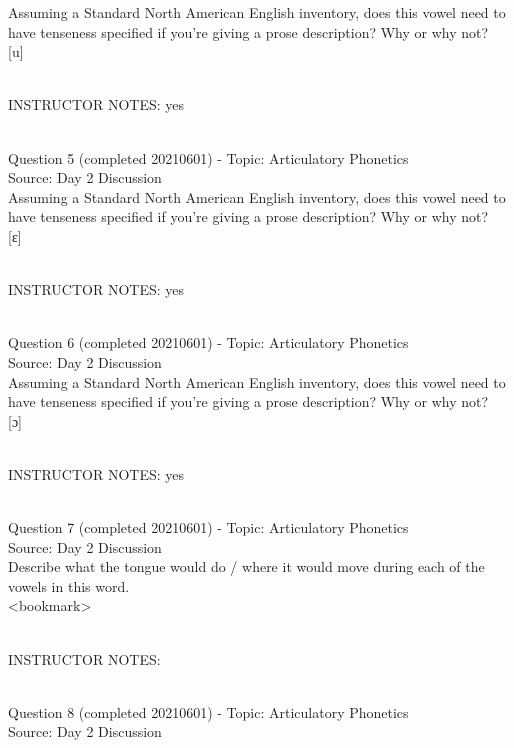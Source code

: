 \documentclass[12pt]{article}
\begin{document}
Assuming a Standard North American English inventory, does this vowel need to have tenseness specified if you're giving a prose description? Why or why not?\\

{[u]}


~\\
INSTRUCTOR NOTES: yes


~\\

{\large Question 5} (completed 20210601) - Topic: Articulatory Phonetics\\
Source: Day 2 Discussion\\

Assuming a Standard North American English inventory, does this vowel need to have tenseness specified if you're giving a prose description? Why or why not?\\

{[ɛ]}


~\\
INSTRUCTOR NOTES: yes


~\\

{\large Question 6} (completed 20210601) - Topic: Articulatory Phonetics\\
Source: Day 2 Discussion\\

Assuming a Standard North American English inventory, does this vowel need to have tenseness specified if you're giving a prose description? Why or why not?\\

{[ɔ]}


~\\
INSTRUCTOR NOTES: yes


~\\

{\large Question 7} (completed 20210601) - Topic: Articulatory Phonetics\\
Source: Day 2 Discussion\\

Describe what the tongue would do / where it would move during each of the vowels in this word.\\

<bookmark>


~\\
INSTRUCTOR NOTES: 


~\\

{\large Question 8} (completed 20210601) - Topic: Articulatory Phonetics\\
Source: Day 2 Discussion\\
\end{document}
